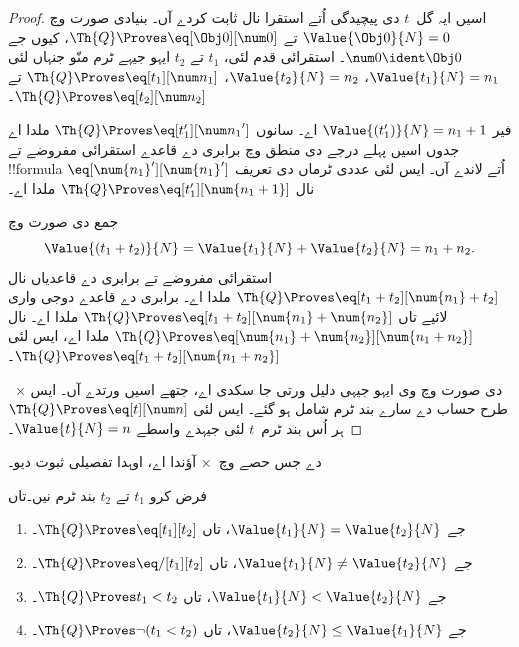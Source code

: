 \documentclass[../../../include/open-logic-section]{subfiles}
\begin{document}
\begin{proof}
اسیں ایہ گل~$t$ دی پیچیدگی اُتے استقرا نال ثابت کردے آں۔
بنیادی صورت وچ $\Value{\Obj 0}{N} = 0$ تے
$\Th{Q} \Proves \eq[\Obj 0][\num 0]$، کیوں جے $\num 0 \ident \Obj 0$۔
%
استقرائی قدم لئی، $t_1$ تے $t_2$ ایہو جیہے ٹرم منّو جنہاں
لئی $\Value{t_1}{N} = n_1$، $\Value{t_2}{N} = n_2$،
$\Th{Q} \Proves \eq[t_1][\num n_1]$ تے
$\Th{Q} \Proves \eq[t_2][\num n_2]$۔

فیر $\Value{(t_1')}{N} = n_1 + 1$ اے۔ سانوں $\Th{Q} \Proves
\eq[t_1'][{\num n_1}']$ ملدا اے جدوں اسیں پہلے درجے دی منطق
وچ برابری دے قاعدے استقرائی مفروضے تے !!{formula}
$\eq[\num{n_1}'][\num{n_1}']$ اُتے لاندے آں۔ ایس لئی عددی
ٹرماں دی تعریف نال $\Th{Q} \Proves \eq[t_1'][\num{n_1 + 1}]$ ملدا اے۔

جمع دی صورت وچ
\[
      \Value{(t_1 + t_2)}{N}
    = \Value{t_1}{N} + \Value{t_2}{N}
    = n_1 + n_2.
\]
استقرائی مفروضے تے برابری دے قاعدیاں نال
$\Th{Q} \Proves \eq[t_1 + t_2][\num{n_1} + t_2]$ ملدا اے۔
برابری دے قاعدے دوجی واری لائیے تاں
$\Th{Q} \Proves \eq[t_1 + t_2][\num{n_1} + \num{n_2}]$ ملدا اے۔
 نال
$\Th{Q} \Proves \eq[\num{n_1} + \num{n_2}][\num{n_1 + n_2}]$
ملدا اے، ایس لئی $\Th{Q} \Proves \eq[t_1 + t_2][\num{n_1 + n_2}]$۔

~$\times$ دی صورت وچ وی ایہو جیہی دلیل ورتی جا سکدی اے، جتھے
اسیں  ورتدے آں۔
%
ایس طرح حساب دے سارے بند ٹرم شامل ہو گئے۔ ایس لئی
$\Th{Q} \Proves \eq[t][\num n]$ ہر اُس بند ٹرم~$t$ لئی
جیہدے واسطے $\Value{t}{N} = n$۔
\end{proof}

\begin{prob}
 دے جس حصے وچ~$\times$ آؤندا اے،
اوہدا تفصیلی ثبوت دیو۔
\end{prob}

\begin{lem}
فرض کرو $t_1$ تے $t_2$ بند ٹرم نیں۔تاں
\begin{enumerate}
\item جے $\Value{t_1}{N} = \Value{t_2}{N}$،
    تاں $\Th{Q} \Proves \eq[t_1][t_2]$۔
\item جے $\Value{t_1}{N} \neq \Value{t_2}{N}$،
    تاں $\Th{Q} \Proves \eq/[t_1][t_2]$۔
\item جے $\Value{t_1}{N} < \Value{t_2}{N}$،
    تاں $\Th{Q} \Proves t_1 < t_2$۔
\item جے $\Value{t_2}{N} \leq \Value{t_1}{N}$،
    تاں $\Th{Q} \Proves \lnot(t_1 < t_2)$۔
\end{enumerate}
\end{lem}
\end{document}
